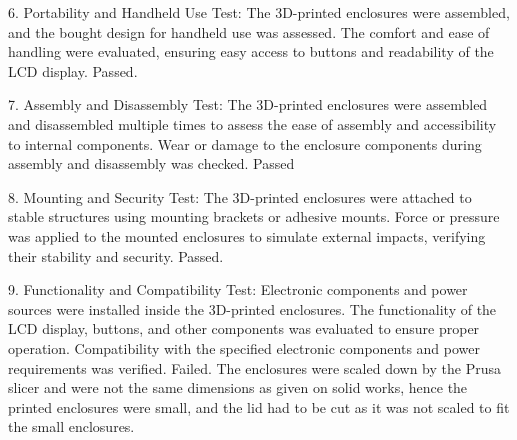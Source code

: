 \documentclass[class=report,11pt,crop=false]{standalone}
\begin{document}
6. Portability and Handheld Use Test:
The 3D-printed enclosures were assembled, and the bought design for handheld use was assessed. The comfort and ease of handling were evaluated, ensuring easy access to buttons and readability of the LCD display. Passed.
\newline

7. Assembly and Disassembly Test:
    The 3D-printed enclosures were assembled and disassembled multiple times to assess the ease of assembly and accessibility to internal components. Wear or damage to the enclosure components during assembly and disassembly was checked. Passed
    \newline

8. Mounting and Security Test:
 The 3D-printed enclosures were attached to stable structures using mounting brackets or adhesive mounts. Force or pressure was applied to the mounted enclosures to simulate external impacts, verifying their stability and security. Passed. 
 \newline

9. Functionality and Compatibility Test:
Electronic components and power sources were installed inside the 3D-printed enclosures. The functionality of the LCD display, buttons, and other components was evaluated to ensure proper operation. Compatibility with the specified electronic components and power requirements was verified.
Failed. The enclosures were scaled down by the Prusa slicer and were not the same dimensions as given on solid works, hence the printed enclosures were small, and the lid had to be cut as it was not scaled to fit the small enclosures. 
\newline









\ifstandalone

\printnoidxglossary[type=\acronymtype,nonumberlist]
\fi
\end{document}
